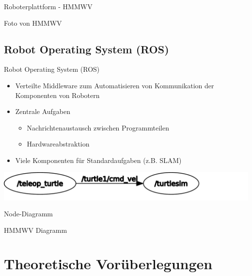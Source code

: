 \documentclass[18pt]{beamer}
\begin{document}
\begin{frame}{Roboterplattform - HMMWV}
\begin{center}
	Foto von HMMWV
\end{center}
\end{frame}


\subsection{Robot Operating System (ROS)}
\begin{frame}{Robot Operating System (ROS)}
\begin{itemize}
	\item Verteilte Middleware zum Automatisieren von Kommunikation der Komponenten von Robotern
	\item Zentrale Aufgaben
	\begin{itemize}
		\item Nachrichtenaustausch zwischen Programmteilen
		\item Hardwareabstraktion
	\end{itemize}
	\item Viele Komponenten für Standardaufgaben (z.B. SLAM)
\end{itemize}
\begin{center}
	\includegraphics[scale=0.35]{images/rosgraph_turtlesim.pdf}
\end{center}
\end{frame}

\begin{frame}{Node-Diagramm}
\begin{center}
	HMMWV Diagramm
\end{center}
\end{frame}



\section{Theoretische Vorüberlegungen}
\end{document}
